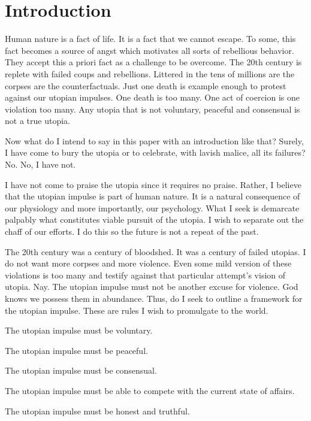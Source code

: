 \documentclass[12pt]{article}
\begin{document}
\pagebreak

\tableofcontents

\pagebreak

\section{Introduction}
Human nature is a fact of life.
It is a fact that we cannot escape.
To some, this fact becomes a source of angst which motivates all sorts of rebellious behavior.
They accept this a priori fact as a challenge to be overcome.
The 20th century is replete with failed coups and rebellions.
Littered in the tens of millions are the corpses are the counterfactuals.
Just one death is example enough to protest against our utopian impulses.
One death is too many.
One act of coercion is one violation too many.
Any utopia that is not voluntary, peaceful and consensual is not a true utopia.

Now what do I intend to say in this paper with an introduction like that?
Surely, I have come to bury the utopia or to celebrate, with lavish malice, all its failures?
No.
No, I have not.

I have not come to praise the utopia since it requires no praise.
Rather, I believe that the utopian impulse is part of human nature.
It is a natural consequence of our physiology and more importantly, our psychology.
What I seek is demarcate palpably what constitutes viable pursuit of the utopia.
I wish to separate out the chaff of our efforts.
I do this so the future is not a repeat of the past.

The 20th century was a century of bloodshed.
It was a century of failed utopias.
I do not want more corpses and more violence.
Even some mild version of these violations is too many and testify against that particular attempt's vision of utopia.
Nay.
The utopian impulse must not be another excuse for violence.
God knows we possess them in abundance.
Thus, do I seek to outline a framework for the utopian impulse.
These are rules I wish to promulgate to the world.

The utopian impulse must be voluntary.

The utopian impulse must be peaceful.

The utopian impulse must be consensual.

The utopian impulse must be able to compete with the current state of affairs.

The utopian impulse must be honest and truthful.
\end{document}
